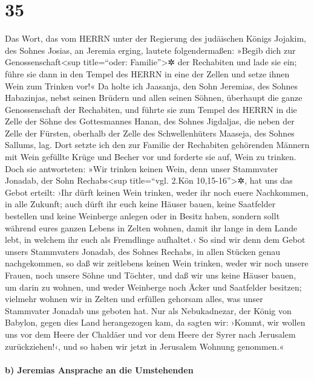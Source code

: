 \hypertarget{section-34}{%
\section{35}\label{section-34}}

Das Wort, das vom HERRN unter der Regierung des judäischen
Königs Jojakim, des Sohnes Josias, an Jeremia erging, lautete
folgendermaßen: »Begib dich zur
Genossenschaft\textless sup title=``oder: Familie''\textgreater✲ der
Rechabiten und lade sie ein; führe sie dann in den Tempel des HERRN in
eine der Zellen und setze ihnen Wein zum Trinken vor!« Da
holte ich Jaasanja, den Sohn Jeremias, des Sohnes Habazinjas, nebst
seinen Brüdern und allen seinen Söhnen, überhaupt die ganze
Genossenschaft der Rechabiten, und führte sie zum Tempel
des HERRN in die Zelle der Söhne des Gottesmannes Hanan, des Sohnes
Jigdaljas, die neben der Zelle der Fürsten, oberhalb der Zelle des
Schwellenhüters Maaseja, des Sohnes Sallums, lag. Dort
setzte ich den zur Familie der Rechabiten gehörenden Männern mit Wein
gefüllte Krüge und Becher vor und forderte sie auf, Wein zu trinken.
Doch sie antworteten: »Wir trinken keinen Wein, denn unser
Stammvater Jonadab, der Sohn Rechabs\textless sup title=``vgl. 2.Kön
10,15-16''\textgreater✲, hat uns das Gebot erteilt: ›Ihr dürft keinen
Wein trinken, weder ihr noch euere Nachkommen, in alle Zukunft;
auch dürft ihr euch keine Häuser bauen, keine Saatfelder
bestellen und keine Weinberge anlegen oder in Besitz haben, sondern
sollt während eures ganzen Lebens in Zelten wohnen, damit ihr lange in
dem Lande lebt, in welchem ihr euch als Fremdlinge aufhaltet.‹
So sind wir denn dem Gebot unsers Stammvaters Jonadab, des
Sohnes Rechabs, in allen Stücken genau nachgekommen, so daß wir
zeitlebens keinen Wein trinken, weder wir noch unsere Frauen, noch
unsere Söhne und Töchter, und daß wir uns keine Häuser
bauen, um darin zu wohnen, und weder Weinberge noch Äcker und Saatfelder
besitzen; vielmehr wohnen wir in Zelten und erfüllen
gehorsam alles, was unser Stammvater Jonadab uns geboten hat.
Nur als Nebukadnezar, der König von Babylon, gegen dies
Land herangezogen kam, da sagten wir: ›Kommt, wir wollen uns vor dem
Heere der Chaldäer und vor dem Heere der Syrer nach Jerusalem
zurückziehen!‹, und so haben wir jetzt in Jerusalem Wohnung genommen.«

\hypertarget{b-jeremias-ansprache-an-die-umstehenden}{%
\paragraph{b) Jeremias Ansprache an die
Umstehenden}\label{b-jeremias-ansprache-an-die-umstehenden}}

